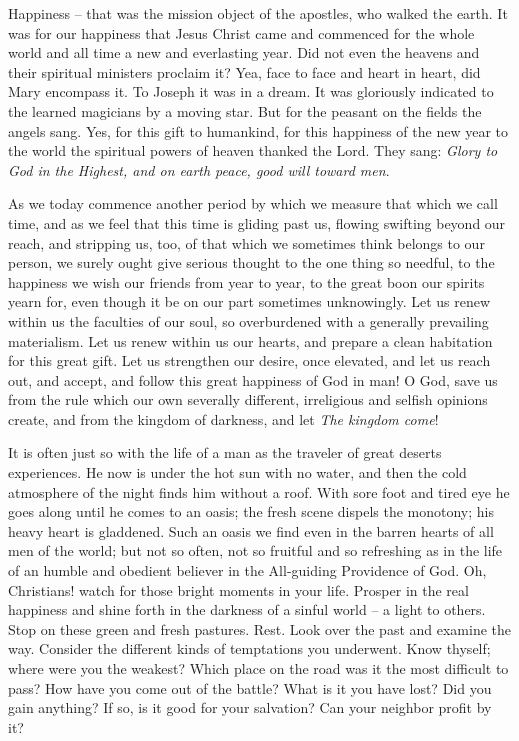 Happiness -- that was the mission object of 
the apostles, who walked the earth. It was for 
our happiness that Jesus Christ came and commenced
for the whole world and all time a 
new and everlasting year. Did not even the 
heavens and their spiritual ministers proclaim 
it? Yea, face to face and heart in heart, did 
Mary encompass it. To Joseph it was in a 
dream. It was gloriously indicated to the 
learned magicians by a moving star. But for 
the peasant on the fields the angels sang. Yes, 
for this gift to humankind, for this happiness 
of the new year to the world the spiritual 
powers of heaven thanked the Lord. They 
sang: \textit{Glory to God in the Highest, and on 
earth peace, good will toward men}.

As we today commence another period by 
which we measure that which we call time, and 
as we feel that this time is gliding past us, 
flowing swifting beyond our reach, and stripping
us, too, of that which we sometimes think
belongs to our person, we surely ought give 
serious thought to the one thing so needful, to 
the happiness we wish our friends from year to 
year, to the great boon our spirits yearn for, 
even though it be on our part sometimes unknowingly.
Let us renew within us the 
faculties of our soul, so overburdened with a 
generally prevailing materialism. Let us renew
within us our hearts, and prepare a clean 
habitation for this great gift. Let us strengthen 
our desire, once elevated, and let us reach out, 
and accept, and follow this great happiness of 
God in man! O God, save us from the rule 
which our own severally different, irreligious 
and selfish opinions create, and from the kingdom
of darkness, and let \textit{The kingdom come}! 

It is often just so with the life of a man as 
the traveler of great deserts experiences. He
now is under the hot sun with no water, and 
then the cold atmosphere of the night finds him 
without a roof. With sore foot and tired eye 
he goes along until he comes to an oasis; the 
fresh scene dispels the monotony; his heavy 
heart is gladdened. Such an oasis we find even 
in the barren hearts of all men of the world; 
but not so often, not so fruitful and so refreshing
as in the life of an humble and obedient
believer in the All-guiding Providence of God. 
Oh, Christians! watch for those bright moments 
in your life. Prosper in the real happiness 
and shine forth in the darkness of a sinful 
world -- a light to others. Stop on these green 
and fresh pastures. Rest. Look over the past 
and examine the way. Consider the different 
kinds of temptations you underwent. Know 
thyself; where were you the weakest? Which 
place on the road was it the most difficult to 
pass? How have you come out of the battle? 
What is it you have lost? Did you gain anything?
If so, is it good for your salvation? 
Can your neighbor profit by it? 

